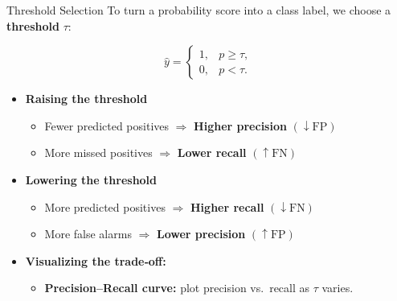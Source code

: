 \documentclass[
  ignorenonframetext,
]{beamer}
\providecommand{\tightlist}{%
  \setlength{\itemsep}{0pt}\setlength{\parskip}{0pt}}
\begin{document}
\begin{frame}{Threshold Selection}
\label{threshold-selection}
To turn a probability score into a class label, we choose a
\textbf{threshold} \(\tau\):

\[
  \hat y = 
  \begin{cases}
    1, & p \ge \tau,\\
    0, & p < \tau.
  \end{cases}
\]

\begin{itemize}
\tightlist
\item
  \textbf{Raising the threshold}

  \begin{itemize}
  \tightlist
  \item
    Fewer predicted positives \(\Rightarrow\) \textbf{Higher precision}
    \((\downarrow \mathrm{FP})\)\\
  \item
    More missed positives \(\Rightarrow\) \textbf{Lower recall}
    \((\uparrow \mathrm{FN})\)
  \end{itemize}
\item
  \textbf{Lowering the threshold}

  \begin{itemize}
  \tightlist
  \item
    More predicted positives \(\Rightarrow\) \textbf{Higher recall}
    \((\downarrow \mathrm{FN})\)\\
  \item
    More false alarms \(\Rightarrow\) \textbf{Lower precision}
    \((\uparrow \mathrm{FP})\)
  \end{itemize}
\item
  \textbf{Visualizing the trade‐off:}

  \begin{itemize}
  \tightlist
  \item
    \textbf{Precision--Recall curve:} plot precision vs.~recall as
    \(\tau\) varies.
  \end{itemize}
\end{itemize}
\end{frame}
\end{document}

